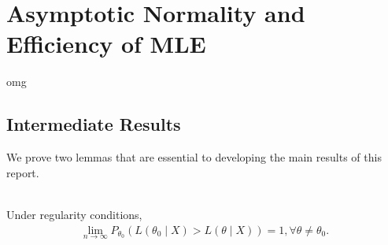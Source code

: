 
\section{Asymptotic Normality and Efficiency of MLE}
omg
\subsection{Intermediate Results}
We prove two lemmas that are essential to developing the main results of this report.\\\\
\begin{lemma} \label{lem:1}
Under regularity conditions,
\begin{align*}
\lim_{n\to\infty} P_{\theta_0}\left( L(\theta_0 \mid X) > L(\theta \mid X) \right) = 1, \forall \theta \neq \theta_0.
\end{align*}
\end{lemma}
